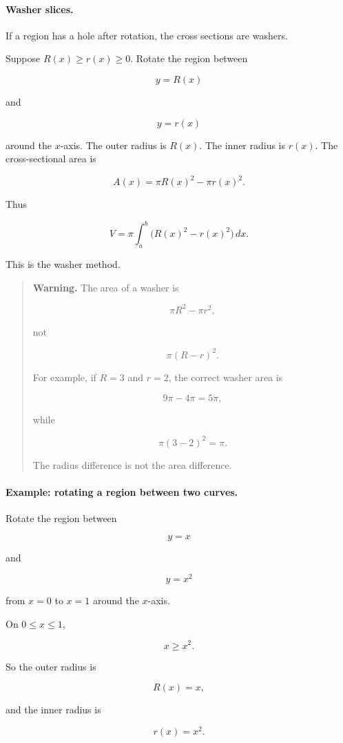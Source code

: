 \paragraph{Washer slices.}
If a region has a hole after rotation, the cross sections are washers.

Suppose \(R(x)\ge r(x)\ge0\).  Rotate the region between

\[
y=R(x)
\]

and

\[
y=r(x)
\]

around the \(x\)-axis.  The outer radius is \(R(x)\).  The inner radius is \(r(x)\).  The
cross-sectional area is

\[
A(x)=\pi R(x)^2-\pi r(x)^2.
\]

Thus

\[
\boxed{
V=\pi\int_a^b \bigl(R(x)^2-r(x)^2\bigr)\,dx.
}
\]

This is the washer method.

\begin{quote}
\textbf{Warning.}
The area of a washer is

\[
\pi R^2-\pi r^2,
\]

not

\[
\pi(R-r)^2.
\]

For example, if \(R=3\) and \(r=2\), the correct washer area is

\[
9\pi-4\pi=5\pi,
\]

while

\[
\pi(3-2)^2=\pi.
\]

The radius difference is not the area difference.
\end{quote}

\paragraph{Example: rotating a region between two curves.}
Rotate the region between

\[
y=x
\]

and

\[
y=x^2
\]

from \(x=0\) to \(x=1\) around the \(x\)-axis.

On \(0\le x\le1\),

\[
x\ge x^2.
\]

So the outer radius is

\[
R(x)=x,
\]

and the inner radius is

\[
r(x)=x^2.
\]

